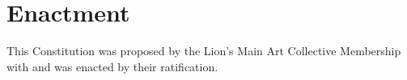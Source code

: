 \chapter{Enactment}\label{sec:enactment}
This Constitution was proposed by the Lion's Main Art Collective Membership with and was enacted \dateapproved by their ratification.
